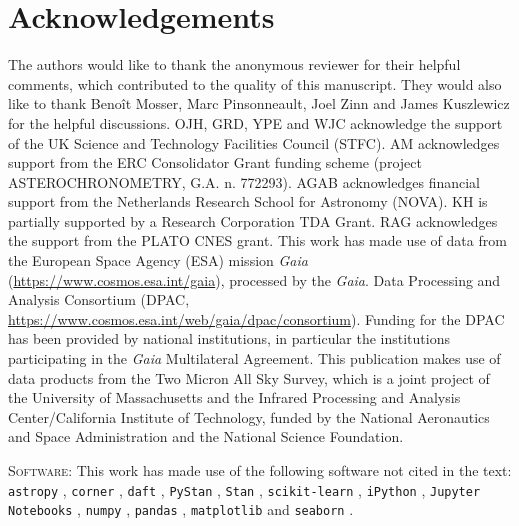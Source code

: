 \documentclass[fleqn,usenatbib]{mnras}
\begin{document}
\section*{Acknowledgements}
The authors would like to thank the anonymous reviewer for their helpful comments, which contributed to the quality of this manuscript. They would also like to thank Beno\^it Mosser, Marc Pinsonneault, Joel Zinn and James Kuszlewicz for the helpful discussions. 
OJH, GRD, YPE and WJC acknowledge the support of the UK Science and Technology Facilities Council (STFC).
AM acknowledges support from the ERC Consolidator Grant funding scheme (project ASTEROCHRONOMETRY, G.A. n. 772293).
AGAB acknowledges financial support from the Netherlands Research School for Astronomy (NOVA).
KH is partially supported by a Research Corporation TDA Grant. 
RAG acknowledges the support from the PLATO CNES grant.
This work has made use of data from the European Space Agency (ESA) mission {\it Gaia} (\url{https://www.cosmos.esa.int/gaia}), processed by the {\it Gaia}.
Data Processing and Analysis Consortium (DPAC, \url{https://www.cosmos.esa.int/web/gaia/dpac/consortium}). Funding for the DPAC has been provided by national institutions, in particular the institutions participating in the {\it Gaia} Multilateral Agreement. This publication makes use of data products from the Two Micron All Sky Survey, which is a joint project of the University of Massachusetts and the Infrared Processing and Analysis Center/California Institute of Technology, funded by the National Aeronautics and Space Administration and the National Science Foundation.

\textsc{Software:} This work has made use of the following software not cited in the text: \texttt{astropy} \citep{art:astropycollaboration+2013, art:astropycollaboration+2018}, \texttt{corner} \citep{sw:corner}, \texttt{daft} \citep{sw:daft}, \texttt{PyStan} \citep{sw:pystan}, \texttt{Stan} \citep{art:carpenter+2017}, \texttt{scikit-learn} \citep{sw:scikit}, \texttt{iPython} \citep{sw:ipython}, \texttt{Jupyter Notebooks} \citep{sw:jupyter}, \texttt{numpy} \citep{sw:numpy}, \texttt{pandas} \citep{sw:pandas}, \texttt{matplotlib} \citep{sw:matplotlib} and \texttt{seaborn} \citep{sw:seaborn}.


\end{document}
